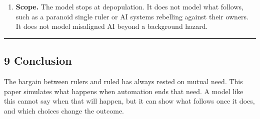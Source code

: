 \documentclass[
  10pt,
]{article}
\providecommand{\tightlist}{%
  \setlength{\itemsep}{0pt}\setlength{\parskip}{0pt}}
\begin{document}
\begin{enumerate}
  \begin{itemize}
  \tightlist
  \item
    \textbf{Feasibility.} We do not ask whether 25 to 50\% adoption by 2030 to 2035 is achievable.
    Today's adoption is set at 0.01\%, and those levels are far above historical diffusion rates.
  \item
    \textbf{Premises.} Two readings carry the result: the cost link and network income growing with
    the economy. At 50\% by 2035, the reduction falls from 0.119 to 0.030 without the cost link and
    to 0.083 with income fixed at its 2026 scale. Under the low reading (no cost link, an untaxed
    network and the other settings in Appendix E.8), the network slightly raises the risk (+0.011,
    95\% interval +0.006 to +0.016).
  \item
    \textbf{Judgment priors.} Several network priors are unconfirmed judgment (Appendix A.4).
  \item
    \textbf{Crackdown analogies.} Crackdown rates come from small communities, crypto bans and the
    suppression of Falun Gong. No network this large has faced a state.
  \item
    \textbf{Missing comparator.} We did not test the same payout routed through the state and
    revocable at will. That comparison would isolate the value of independence from the state.
  \item
    \textbf{Possible understatement.} The earlier stages of the scenario tree ignore the network.
  \end{itemize}
\item
  \textbf{Scope.} The model stops at depopulation. It does not model what follows, such as a
  paranoid single ruler or AI systems rebelling against their owners. It does not model misaligned
  AI beyond a background hazard.
\end{enumerate}

\begin{center}\rule{0.5\linewidth}{0.5pt}\end{center}

\subsection{9 Conclusion}\label{conclusion}

The bargain between rulers and ruled has always rested on mutual need. This paper simulates what
happens when automation ends that need. A model like this cannot say when that will happen, but it
can show what follows once it does, and which choices change the outcome.
\end{document}
